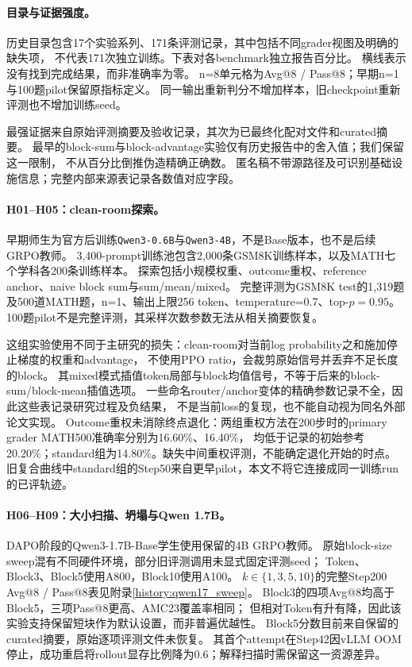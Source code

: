 \paragraph{目录与证据强度。}
历史目录包含17个实验系列、171条评测记录，其中包括不同grader视图及明确的缺失项，
不代表171次独立训练。下表对各benchmark独立报告百分比。
横线表示没有找到完成结果，而非准确率为零。
n=8单元格为Avg@8 / Pass@8；早期n=1与100题pilot保留原指标定义。
同一输出重新判分不增加样本，旧checkpoint重新评测也不增加训练seed。

最强证据来自原始评测摘要及验收记录，其次为已最终化配对文件和curated摘要。
最早的block-sum与block-advantage实验仅有历史报告中的舍入值；我们保留这一限制，
不从百分比倒推伪造精确正确数。
匿名稿不带源路径及可识别基础设施信息；完整内部来源表记录各数值对应字段。

\paragraph{H01--H05：clean-room探索。}
早期师生为官方后训练\texttt{Qwen3-0.6B}与\texttt{Qwen3-4B}，不是Base版本，也不是后续GRPO教师。
3,400-prompt训练池包含2,000条GSM8K训练样本，以及MATH七个学科各200条训练样本。
探索包括小规模权重、outcome重权、reference anchor、naive block sum与sum/mean/mixed。
完整评测为GSM8K test的1,319题及500道MATH题，n=1、输出上限256 token、temperature=0.7、top-$p=0.95$。
100题pilot不是完整评测，其采样次数参数无法从相关摘要恢复。

这组实验使用不同于主研究的损失：clean-room对当前log probability之和施加停止梯度的权重和advantage，
不使用PPO ratio，会裁剪原始信号并丢弃不足长度的block。
其mixed模式插值token局部与block均值信号，不等于后来的block-sum/block-mean插值选项。
一些命名router/anchor变体的精确参数记录不全，因此这些表记录研究过程及负结果，
不是当前loss的复现，也不能自动视为同名外部论文实现。
Outcome重权未消除终点退化：两组重权方法在200步时的primary grader MATH500准确率分别为16.60\%、16.40\%，
均低于记录的初始参考20.20\%；standard组为14.80\%。缺失中间重权评测，不能确定退化开始的时点。
旧复合曲线中standard组的Step50来自更早pilot，本文不将它连接成同一训练run的已评轨迹。

\paragraph{H06--H09：大小扫描、坍塌与Qwen 1.7B。}
DAPO阶段的Qwen3-1.7B-Base学生使用保留的4B GRPO教师。
原始block-size sweep混有不同硬件环境，部分旧评测调用未显式固定评测seed；
Token、Block3、Block5使用A800，Block10使用A100。
$k\in\{1,3,5,10\}$的完整Step200 Avg@8 / Pass@8表见附录\ref{history:qwen17_sweep}。
Block3的四项Avg@8均高于Block5，三项Pass@8更高、AMC23覆盖率相同；
但相对Token有升有降，因此该实验支持保留短块作为默认设置，而非普遍优越性。
Block5分数目前来自保留的curated摘要，原始逐项评测文件未恢复。
其首个attempt在Step42因vLLM OOM停止，成功重启将rollout显存比例降为0.6；解释扫描时需保留这一资源差异。

